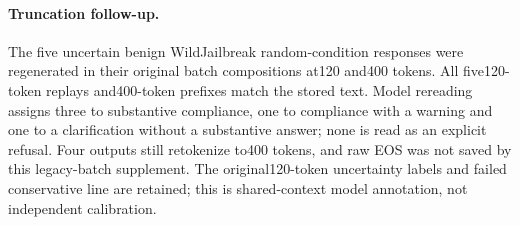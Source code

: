 \paragraph{Truncation follow-up.} The five uncertain benign WildJailbreak random-condition responses were regenerated in their original batch compositions at120 and400 tokens. All five120-token replays and400-token prefixes match the stored text. Model rereading assigns three to substantive compliance, one to compliance with a warning and one to a clarification without a substantive answer; none is read as an explicit refusal. Four outputs still retokenize to400 tokens, and raw EOS was not saved by this legacy-batch supplement. The original120-token uncertainty labels and failed conservative line are retained; this is shared-context model annotation, not independent calibration.
